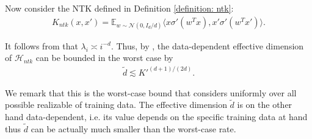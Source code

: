 \documentclass{article} \usepackage{iclr2023/iclr2023_conference,times}
\begin{document}
Now consider the NTK defined in Definition \ref{definition: ntk}: 
\begin{align*}
    K_{ntk}(x,x') = \mathbb{E}_{w \sim \mathcal{N}(0, I_d/d)} \langle x \sigma'(w^T x), x' \sigma'(w^T x') \rangle. 
\end{align*}

It follows from \cite[Proposition~1]{bietti2019inductive} that $\lambda_i \asymp i^{-d} $. Thus, by \cite[Theorem~5]{srinivas2009gaussian}, the data-dependent effective dimension of $\mathcal{H}_{ntk}$ can be bounded in the worst case by  
\begin{align*}
    \tilde{d} \lesssim K'^{(d+1) / (2d)} . 
\end{align*}

We remark that this is the worst-case bound that considers uniformly over all possible realizable of training data. The effective dimension $\tilde{d}$ is on the other hand data-dependent, i.e. its value depends on the specific training data at hand thus $\tilde{d}$ can be actually much smaller than the worst-case rate. 
\end{document}
